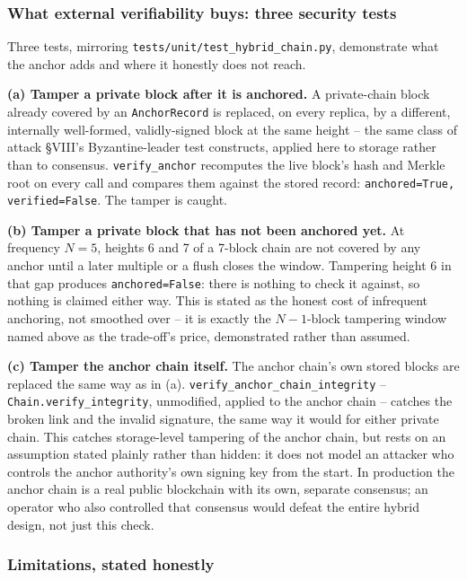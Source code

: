 \documentclass[conference]{IEEEtran}
\begin{document}
\subsubsection{What external verifiability buys: three security tests}

Three tests, mirroring \texttt{tests/unit/test\_hybrid\_chain.py}, demonstrate what the anchor
adds and where it honestly does not reach.

\textbf{(a) Tamper a private block after it is anchored.} A private-chain block already covered by
an \texttt{AnchorRecord} is replaced, on every replica, by a different, internally
well-formed, validly-signed block at the same height -- the same class of attack \S VIII's
Byzantine-leader test constructs, applied here to storage rather than to consensus.
\texttt{verify\_anchor} recomputes the live block's hash and Merkle root on every call and compares
them against the stored record: \texttt{anchored=True, verified=False}. The tamper is caught.

\textbf{(b) Tamper a private block that has not been anchored yet.} At frequency $N{=}5$, heights
6 and 7 of a 7-block chain are not covered by any anchor until a later multiple or a flush closes
the window. Tampering height 6 in that gap produces \texttt{anchored=False}: there is nothing to
check it against, so nothing is claimed either way. This is stated as the honest cost of
infrequent anchoring, not smoothed over -- it is exactly the $N{-}1$-block tampering window named
above as the trade-off's price, demonstrated rather than assumed.

\textbf{(c) Tamper the anchor chain itself.} The anchor chain's own stored blocks are replaced the
same way as in (a). \texttt{verify\_anchor\_chain\_integrity} -- \texttt{Chain.verify\_integrity},
unmodified, applied to the anchor chain -- catches the broken link and the invalid signature, the
same way it would for either private chain. This catches storage-level tampering of the anchor
chain, but rests on an assumption stated plainly rather than hidden: it does not model an attacker
who controls the anchor authority's own signing key from the start. In production the anchor chain
is a real public blockchain with its own, separate consensus; an operator who also controlled that
consensus would defeat the entire hybrid design, not just this check.

\subsubsection{Limitations, stated honestly}
\end{document}
